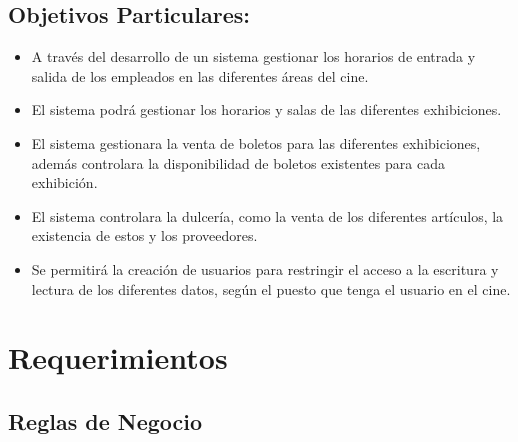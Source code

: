 \documentclass[12pt, fleqn]{report}                             %
\begin{document}
        \subsection{Objetivos Particulares:}

            \begin{itemize}
                \item A través del desarrollo de un sistema gestionar los horarios de entrada y
                    salida de los empleados en las diferentes áreas del cine.
                
                \item El sistema podrá gestionar los horarios y salas de las diferentes exhibiciones.

                \item El sistema gestionara la venta de boletos para las diferentes exhibiciones,
                    además controlara la disponibilidad de boletos existentes para cada exhibición.

                \item El sistema controlara la dulcería, como la venta de los diferentes artículos,
                    la existencia de estos y los proveedores.

                \item Se permitirá la creación de usuarios para restringir el acceso a la escritura y
                    lectura de los diferentes datos, según el puesto que tenga el usuario en el cine.

            \end{itemize}



    \section{Requerimientos}


        \subsection{Reglas de Negocio}
\end{document}
